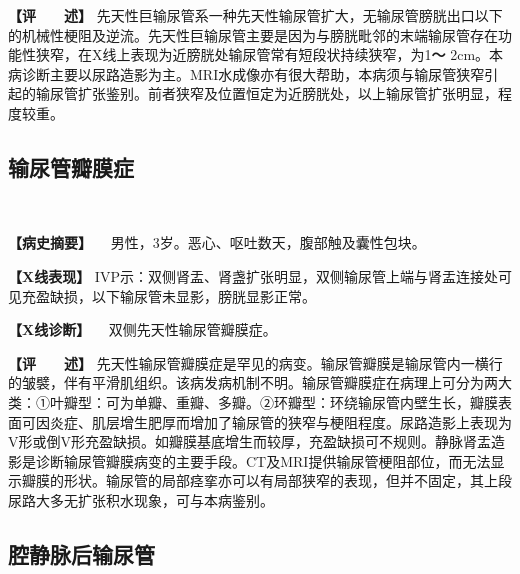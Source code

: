 \textbf{【评　　述】}
先天性巨输尿管系一种先天性输尿管扩大，无输尿管膀胱出口以下的机械性梗阻及逆流。先天性巨输尿管主要是因为与膀胱毗邻的末端输尿管存在功能性狭窄，在X线上表现为近膀胱处输尿管常有短段状持续狭窄，为1\textbf{～}
2cm。本病诊断主要以尿路造影为主。MRI水成像亦有很大帮助，本病须与输尿管狭窄引起的输尿管扩张鉴别。前者狭窄及位置恒定为近膀胱处，以上输尿管扩张明显，程度较重。

\subsection{输尿管瓣膜症}

\begin{figure}
    \centering
        \\
    \caption{}
    \label{fig6-2-9}
\end{figure}


\textbf{【病史摘要】} 　男性，3岁。恶心、呕吐数天，腹部触及囊性包块。

\textbf{【X线表现】}
IVP示：双侧肾盂、肾盏扩张明显，双侧输尿管上端与肾盂连接处可见充盈缺损，以下输尿管未显影，膀胱显影正常。

\textbf{【X线诊断】} 　双侧先天性输尿管瓣膜症。

\textbf{【评　　述】}
先天性输尿管瓣膜症是罕见的病变。输尿管瓣膜是输尿管内一横行的皱襞，伴有平滑肌组织。该病发病机制不明。输尿管瓣膜症在病理上可分为两大类：①叶瓣型：可为单瓣、重瓣、多瓣。②环瓣型：环绕输尿管内壁生长，瓣膜表面可因炎症、肌层增生肥厚而增加了输尿管的狭窄与梗阻程度。尿路造影上表现为V形或倒V形充盈缺损。如瓣膜基底增生而较厚，充盈缺损可不规则。静脉肾盂造影是诊断输尿管瓣膜病变的主要手段。CT及MRI提供输尿管梗阻部位，而无法显示瓣膜的形状。输尿管的局部痉挛亦可以有局部狭窄的表现，但并不固定，其上段尿路大多无扩张积水现象，可与本病鉴别。

\subsection{腔静脉后输尿管}

